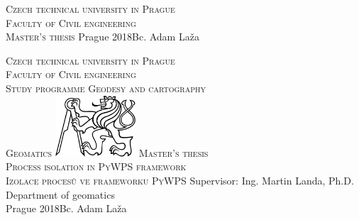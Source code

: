\begin{center}
\newcommand{\napisCVUT}{Czech technical university in Prague}
\newcommand{\napisFS}{Faculty of Civil engineering}
\newcommand{\napisProgram}{Study programme Geodesy and cartography}
\newcommand{\napisObor}{Geomatics}
\newcommand{\napisKatedra}{Department of geomatics}
\newcommand{\napisVedouci}{Supervisor: Ing. Martin Landa, Ph.D.}
\newcommand{\napisAutor}{Bc. Adam Laža}
\newcommand{\napisDatum}{Prague 2018}
\newcommand{\napisNazevI}{Process isolation in PyWPS framework}
\newcommand{\napisNazevAjI}{Izolace procesů ve frameworku PyWPS}
\newcommand{\napisDiplomka}{Master's thesis}
\newcommand{\napisPraha}{Prague 2018}
%
\newcommand{\velka}[1]{\textsc{#1}}
%
% 
\newif\ifpatitul
\patitultrue

\ifpatitul
{\Large\velka{\napisCVUT}}\\
\velka{\Large\napisFS}\\
\vfill
{\LARGE\velka{\napisDiplomka}}
\vfill
{\large\napisPraha\hfill\napisAutor}
\newpage
\fi%


{\Large\velka{\napisCVUT}}\\
{\Large\velka{\napisFS}}\\
{\Large\velka{\napisProgram}}\\
{\Large\velka{\napisObor}}
\vfill
\includegraphics[width=3cm]{logo_cvut_cb} %
\vfill
{\Large\velka{\napisDiplomka}}\\
\Large\velka{\napisNazevI}\\
\large\velka{\napisNazevAjI}
\vfill
{\large%
\napisVedouci\\
\napisKatedra\\
\bigskip
\napisDatum\hfill\napisAutor}
\end{center}
